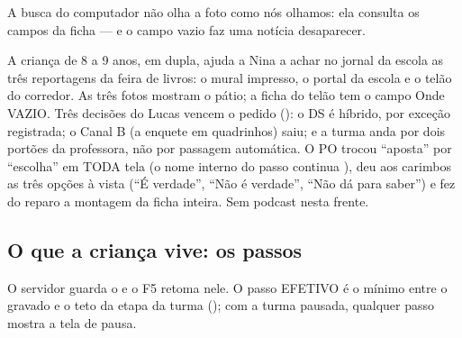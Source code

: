 \begin{destaque}
A busca do computador não olha a foto como nós olhamos: ela consulta os
campos da ficha --- e o campo vazio faz uma notícia desaparecer.
\end{destaque}

A criança de 8 a 9 anos, em dupla, ajuda a Nina a achar no jornal da escola
as três reportagens da feira de livros: o mural impresso, o portal da escola
e o telão do corredor. As três fotos mostram o pátio; a ficha do telão tem o
campo Onde VAZIO. Três decisões do Lucas vencem o pedido (): o
DS é híbrido, por exceção registrada; o Canal B (a enquete em quadrinhos)
saiu; e a turma anda por dois portões da professora, não por passagem
automática. O PO trocou \enquote{aposta} por \enquote{escolha} em TODA tela
(o nome interno do passo continua ), deu aos carimbos as três
opções à vista (\enquote{É verdade}, \enquote{Não é verdade}, \enquote{Não dá
para saber}) e fez do reparo a montagem da ficha inteira. Sem podcast nesta
frente.

\subsection{O que a criança vive: os passos}

O servidor guarda o  e o F5 retoma nele. O passo EFETIVO é o mínimo
entre o gravado e o teto da etapa da turma (); com a
turma pausada, qualquer passo mostra a tela de pausa.

